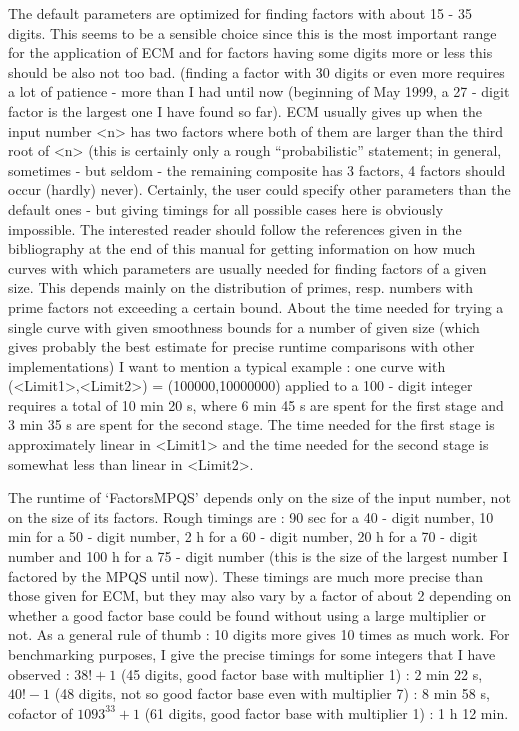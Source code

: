 The default parameters are optimized for finding factors with about
15 - 35 digits. This seems to be a sensible choice since this is the
most important range for the application of ECM and for factors
having some digits more or less this should be also not too bad.
(finding a factor with 30 digits or even more requires a lot of
patience - more than I had until now (beginning of May 1999,
a 27 - digit factor is the largest one I have found so far).
ECM usually gives up when the input number <n> has two factors where 
both of them are larger than the third root of <n> (this is certainly
only a rough ``probabilistic'' statement; in general, sometimes 
- but seldom - the remaining composite has 3 factors, 4 factors should
occur (hardly) never). 
Certainly, the user could specify other parameters than 
the default ones - but giving timings for all possible cases here is
obviously impossible. The interested reader should follow the references
given in the bibliography at the end of this manual for getting
information on how much curves with which parameters are usually 
needed for finding factors of a given size. This depends mainly on the
distribution of primes, resp. numbers with prime factors not exceeding a
certain bound.
About the time needed for trying a single curve with given smoothness
bounds for a number of given size (which gives probably the best estimate
for precise runtime comparisons with other implementations) I want to
mention a typical example : one curve with (<Limit1>,<Limit2>) =
(100000,10000000) applied to a 100 - digit integer requires a total of
10 min 20 s, where 6 min 45 s are spent for the first stage
and 3 min 35 s are spent for the second stage.
The time needed for the first stage is approximately linear in <Limit1>
and the time needed for the second stage is somewhat less than linear
in <Limit2>.


The runtime of `FactorsMPQS' depends only on the size of the input
number, not on the size of its factors.
Rough timings are : 90 sec for a 40 - digit number, 10 min for a
50 - digit number, 2 h for a 60 - digit number, 20 h for a 70 - digit
number and 100 h for a 75 - digit number (this is the size of the
largest number I factored by the MPQS until now).
These timings are much more precise
than those given for ECM, but they may also vary by a factor of about 2
depending on whether a good factor base could be found without using
a large multiplier or not.
As a general rule of thumb : 10 digits more gives 10 times as much
work. 
For benchmarking purposes, I give the precise timings for some integers
that I have observed : $38! + 1$ (45 digits, good factor base with
multiplier 1) : 2 min 22 s, $40! - 1$ (48 digits, not so good factor
base even with multiplier 7) : 8 min 58 s, cofactor of $1093^{33}+1$
(61 digits, good factor base with multiplier 1) : 1 h 12 min.

